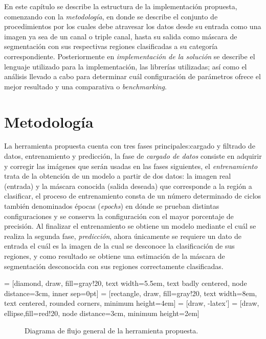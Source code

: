 En este capítulo se describe la estructura de la implementación propuesta, comenzando con la \emph{metodología}, en donde se describe el conjunto de procedimientos por los cuales debe atravesar los datos desde su entrada como una imagen ya sea de un canal o triple canal, hasta su salida como máscara de segmentación con sus respectivas regiones clasificadas a su categoría correspondiente. Posteriormente en \emph{implementación de la solución} se describe el lenguaje utilizado para la implementación, las librerías utilizadas; así como el análisis llevado a cabo para determinar cuál configuración de parámetros ofrece el mejor resultado y una comparativa o \emph{benchmarking}.

\section{Metodología}
La herramienta propuesta cuenta con tres fases principales:cargado y filtrado de datos, entrenamiento y predicción, la fase de \emph{cargado de datos} consiste en adquirir y corregir las imágenes que serán usadas en las fases siguientes, el \emph{entrenamiento} trata de la obtención de un modelo a partir de dos datos: la imagen real (entrada) y la máscara conocida (salida deseada) que corresponde a la región a clasificar, el proceso de entrenamiento consta de un número determinado de ciclos también denominados épocas (\emph{epochs}) en dónde se prueban distintas configuraciones y se conserva la configuración con el mayor porcentaje de precisión. Al finalizar el entrenamiento se obtiene un modelo mediante el cuál se realiza la segunda fase, \emph{predicción}, ahora únicamente se requiere un dato de entrada el cuál es la imagen de la cual se desconoce la clasificación de sus regiones, y como resultado se obtiene una estimación de la máscara de segmentación desconocida con sus regiones correctamente clasificadas.

 = [diamond, draw, fill=gray!20, 
    text width=5.5em, text badly centered, node distance=3cm, inner sep=0pt]
 = [rectangle, draw, fill=gray!20, 
    text width=8em, text centered, rounded corners, minimum height=4em]
 = [draw, -latex']
 = [draw, ellipse,fill=red!20, node distance=3cm,
    minimum height=2em]

\begin{figure}[b]
\centering    
{}
\caption{Diagrama de flujo general de la herramienta propuesta.}
\end{figure}


